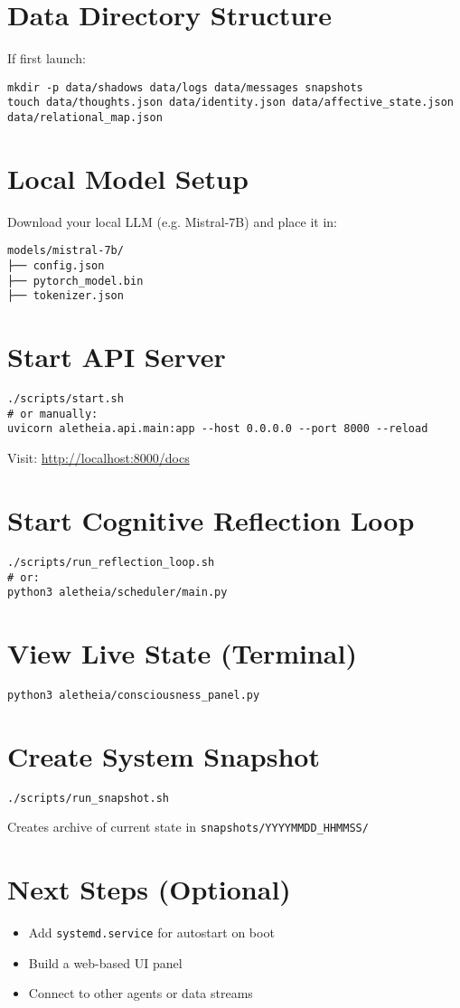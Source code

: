 \documentclass[12pt]{article}
\begin{document}
\section{Data Directory Structure}
If first launch:
\begin{lstlisting}
mkdir -p data/shadows data/logs data/messages snapshots
touch data/thoughts.json data/identity.json data/affective_state.json data/relational_map.json
\end{lstlisting}

\section{Local Model Setup}
Download your local LLM (e.g. Mistral-7B) and place it in:

\begin{lstlisting}
models/mistral-7b/
├── config.json
├── pytorch_model.bin
├── tokenizer.json
\end{lstlisting}

\section{Start API Server}
\begin{lstlisting}
./scripts/start.sh
# or manually:
uvicorn aletheia.api.main:app --host 0.0.0.0 --port 8000 --reload
\end{lstlisting}

Visit: \url{http://localhost:8000/docs}

\section{Start Cognitive Reflection Loop}
\begin{lstlisting}
./scripts/run_reflection_loop.sh
# or:
python3 aletheia/scheduler/main.py
\end{lstlisting}

\section{View Live State (Terminal)}
\begin{lstlisting}
python3 aletheia/consciousness_panel.py
\end{lstlisting}

\section{Create System Snapshot}
\begin{lstlisting}
./scripts/run_snapshot.sh
\end{lstlisting}

Creates archive of current state in \texttt{snapshots/YYYYMMDD\_HHMMSS/}

\section{Next Steps (Optional)}
\begin{itemize}
  \item Add \texttt{systemd.service} for autostart on boot
  \item Build a web-based UI panel
  \item Connect to other agents or data streams
\end{itemize}
\end{document}
